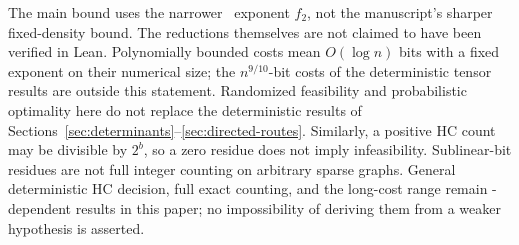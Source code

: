 The main bound uses the narrower \HLean\ exponent $f_2$, not the
manuscript's sharper fixed-density bound. The reductions themselves
are not claimed to have been verified in Lean. Polynomially bounded
costs mean $O(\log n)$ bits with a fixed exponent on their numerical
size; the $n^{9/10}$-bit costs of the deterministic tensor results are
outside this statement. Randomized feasibility and probabilistic
optimality here do not replace the deterministic results of
Sections~\ref{sec:determinants}--\ref{sec:directed-routes}.
Similarly, a positive HC count may be divisible by $2^b$, so a zero
residue does not imply infeasibility. Sublinear-bit residues are not
full integer counting on arbitrary sparse graphs. General
deterministic HC decision, full exact counting, and the long-cost
range remain \HTC-dependent results in this paper; no impossibility
of deriving them from a weaker hypothesis is asserted.

